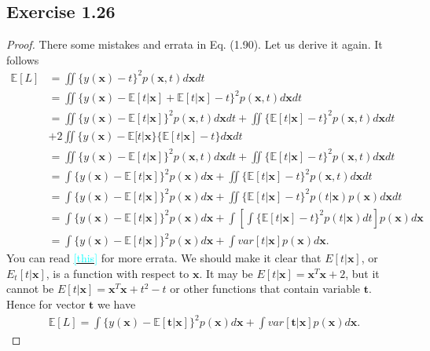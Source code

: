 \documentclass[11pt]{article}
\theoremstyle{definition}
\newcommand{\E}{\mathbb{E}}
\newcommand{\cyan}[1]{\textcolor{cyan}{#1}}
\begin{document}
\subsection{Exercise 1.26}
\begin{proof}
There some mistakes and errata in Eq. (1.90). Let us derive it again. It follows
\begin{align*}
\E[L] &= \iint\{y(\textbf{x})-t\}^2p(\textbf{x}, t)d\textbf{x}dt\\
&= \iint\{y(\textbf{x})-\E[t|\textbf{x}]+\E[t|\textbf{x}]-t\}^2p(\textbf{x}, t)d\textbf{x}dt \\
&= \iint\{y(\textbf{x})-\E[t|\textbf{x}]\}^2p(\textbf{x}, t)d\textbf{x}dt + \iint\{\E[t|\textbf{x}]-t\}^2p(\textbf{x}, t)d\textbf{x}dt \\
&+ 2\iint\{y(\textbf{x})-\E[t|\textbf{x}\}\{\E[t|\textbf{x}]-t\}d\textbf{x}dt \\
&= \iint\{y(\textbf{x})-\E[t|\textbf{x}]\}^2p(\textbf{x}, t)d\textbf{x}dt + \iint\{\E[t|\textbf{x}]-t\}^2p(\textbf{x}, t)d\textbf{x}dt \\
&= \int\{y(\textbf{x})-\E[t|\textbf{x}]\}^2p(\textbf{x})d\textbf{x} + \iint\{\E[t|\textbf{x}]-t\}^2p(\textbf{x}, t)d\textbf{x}dt \\
&=\int\{y(\textbf{x})-\E[t|\textbf{x}]\}^2p(\textbf{x})d\textbf{x} + \iint\{\E[t|\textbf{x}]-t\}^2p(t|\textbf{x})p(\textbf{x})d\textbf{x}dt \\
&= \int\{y(\textbf{x})-\E[t|\textbf{x}]\}^2p(\textbf{x})d\textbf{x} + \int\left[\int\{\E[t|\textbf{x}]-t\}^2p(t|\textbf{x})dt\right]p(\textbf{x})d\textbf{x} \\
&= \int\{y(\textbf{x})-\E[t|\textbf{x}]\}^2p(\textbf{x})d\textbf{x} + \int var[t|\textbf{x}]p(\textbf{x})d\textbf{x}.
\end{align*}
You can read \href{https://www.microsoft.com/en-us/research/wp-content/uploads/2016/05/prml-errata-1st-20110921.pdf}{\cyan{[this]}} for more errata. We should make it clear that $E[t|\textbf{x}]$, or $E_t[t|\textbf{x}]$, is a function with respect to $\textbf{x}$. It may be $E[t|\textbf{x}] = \textbf{x}^T\textbf{x} + 2$, but it cannot be $E[t|\textbf{x}] = \textbf{x}^T\textbf{x} + t^2-t$ or other functions that contain variable $\textbf{t}$. Hence for vector $\textbf{t}$ we have
\begin{align*}
\E[L] = \int\{y(\textbf{x})-\E[\textbf{t}|\textbf{x}]\}^2p(\textbf{x})d\textbf{x} + \int var[\textbf{t}|\textbf{x}]p(\textbf{x})d\textbf{x}.
\end{align*}
\end{proof}
\end{document}
